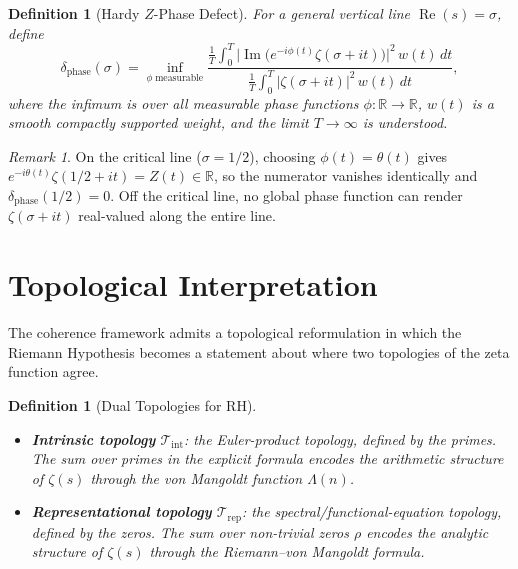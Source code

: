 \documentclass[11pt]{article}
\newtheorem{definition}[theorem]{Definition}
\theoremstyle{remark}
\newtheorem{remark}[theorem]{Remark}
\DeclareMathOperator{\Ima}{Im}
\DeclareMathOperator{\Rea}{Re}
\begin{document}
\begin{definition}[Hardy $Z$-Phase Defect]
\label{def:phase-defect}
For a general vertical line $\Rea(s)=\sigma$, define
\begin{equation}\label{eq:delta-phase}
  \delta_{\mathrm{phase}}(\sigma) = \inf_{\phi\;\mathrm{measurable}}
  \frac{\displaystyle\frac{1}{T}\int_0^T
    \bigl|\Ima\bigl(e^{-i\phi(t)}\zeta(\sigma+it)\bigr)\bigr|^2\,w(t)\,dt}
  {\displaystyle\frac{1}{T}\int_0^T |\zeta(\sigma+it)|^2\,w(t)\,dt},
\end{equation}
where the infimum is over all measurable phase functions $\phi\colon\mathbb{R}\to\mathbb{R}$,
$w(t)$ is a smooth compactly supported weight, and the limit $T\to\infty$ is understood.
\end{definition}

\begin{remark}
On the critical line ($\sigma=1/2$), choosing $\phi(t)=\theta(t)$ gives
$e^{-i\theta(t)}\zeta(1/2+it)=Z(t)\in\mathbb{R}$, so the numerator vanishes identically
and $\delta_{\mathrm{phase}}(1/2)=0$.
Off the critical line, no global phase function can render $\zeta(\sigma+it)$ real-valued
along the entire line.
\end{remark}

\section{Topological Interpretation}
\label{sec:topology}

The coherence framework admits a topological reformulation in which the
Riemann Hypothesis becomes a statement about where two topologies of the
zeta function agree.

\begin{definition}[Dual Topologies for RH]
\label{def:rh-topo}
\mbox{}
\begin{itemize}
\item \textbf{Intrinsic topology} $\mathcal{T}_{\mathrm{int}}$:
the Euler-product topology, defined by the primes.  The sum over
primes in the explicit formula encodes the arithmetic structure
of $\zeta(s)$ through the von Mangoldt function $\Lambda(n)$.
\item \textbf{Representational topology} $\mathcal{T}_{\mathrm{rep}}$:
the spectral/functional-equation topology, defined by the zeros.
The sum over non-trivial zeros $\rho$ encodes the analytic
structure of $\zeta(s)$ through the Riemann--von Mangoldt formula.
\end{itemize}
\end{definition}
\end{document}
